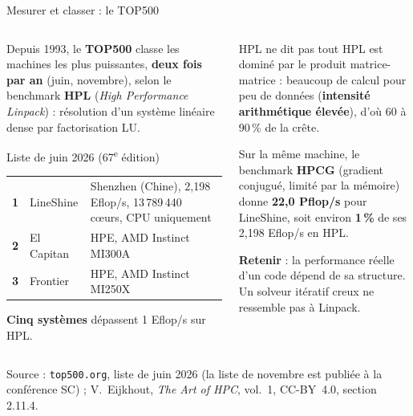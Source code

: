 \documentclass[8pt,aspectratio=169]{beamer}
\newcommand{\src}[1]{\vfill{\tiny\color{gray}Source : #1\par}}
\newcommand{\eij}{V.~Eijkhout, \emph{The Art of HPC}, vol.~1, CC-BY~4.0}
\begin{document}
\begin{frame}{Mesurer et classer : le TOP500}
\begin{columns}[T]
\begin{column}{0.5\textwidth}
Depuis 1993, le \textbf{TOP500} classe les machines les plus puissantes, \textbf{deux fois par an} (juin, novembre), selon le benchmark \textbf{HPL} (\emph{High Performance Linpack}) : résolution d'un système linéaire dense par factorisation LU.

\medskip
\begin{block}{Liste de juin 2026 (67\textsuperscript{e} édition)}
\begin{tabular}{@{}cL{2.3cm}L{2.6cm}@{}}
\textbf{1} & LineShine & Shenzhen (Chine), 2,198 Eflop/s, 13\,789\,440 cœurs, CPU uniquement\\
\textbf{2} & El Capitan & HPE, AMD Instinct MI300A\\
\textbf{3} & Frontier & HPE, AMD Instinct MI250X\\
\end{tabular}

\smallskip
\textbf{Cinq systèmes} dépassent 1 Eflop/s sur HPL.
\end{block}
\end{column}
\begin{column}{0.46\textwidth}
\begin{alertblock}{HPL ne dit pas tout}
HPL est dominé par le produit matrice-matrice : beaucoup de calcul pour peu de données (\textbf{intensité arithmétique élevée}), d'où 60 à 90\,\% de la crête.

\smallskip
Sur la même machine, le benchmark \textbf{HPCG} (gradient conjugué, limité par la mémoire) donne \textbf{22,0 Pflop/s} pour LineShine, soit environ \textbf{1\,\%} de ses 2,198 Eflop/s en HPL.
\end{alertblock}
\textbf{Retenir} : la performance réelle d'un code dépend de sa structure. Un solveur itératif creux ne ressemble pas à Linpack.
\end{column}
\end{columns}
\src{\texttt{top500.org}, liste de juin 2026 (la liste de novembre est publiée à la conférence SC) ; \eij{}, section 2.11.4.}
\end{frame}
\end{document}
